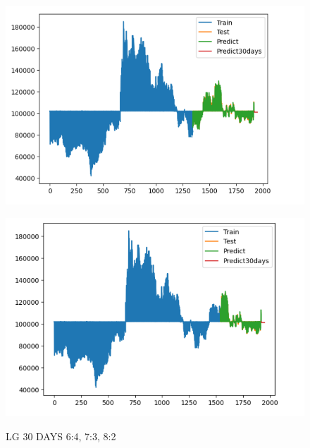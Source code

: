 \documentclass{article}
\begin{document}
\begin{multicols}{2}
\begin{figure}[H]
\begin{minipage}{0.15\textwidth}
    \label{fig:1}
    \end{minipage}%
    \begin{minipage}{0.15\textwidth}
    \centering
    \includegraphics[width=1\textwidth]{Image/GradientBoosting/LG_30_7_3_GradientBoostingRegressor.png}
  
    \label{fig:2}
    \end{minipage}%
    \begin{minipage}{0.15\textwidth}
    \centering
    \includegraphics[width=1\textwidth]{Image/GradientBoosting/LG_30_8_2_GradientBoostingRegressor.png}

    \label{fig:3}
    \end{minipage}
    \caption{LG 30 DAYS  6:4, 7:3, 8:2 }
\end{figure}


\end{multicols}
\end{document}
